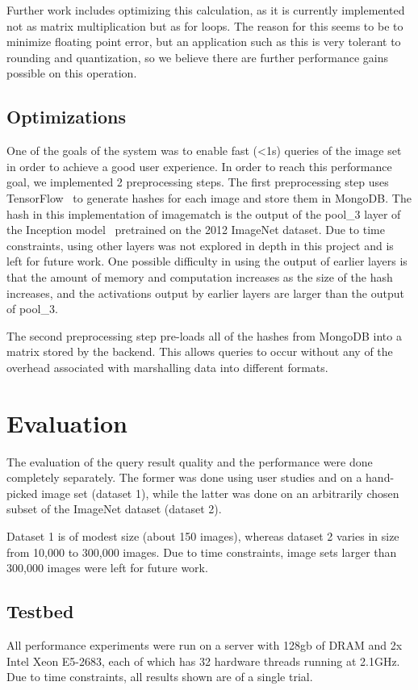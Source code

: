 Further work includes optimizing this calculation, as it is currently implemented not as matrix multiplication
but as for loops.
The reason for this seems to be to minimize floating point error, but an application such as this is very
tolerant to rounding and quantization, so we believe there are further performance gains possible on this
operation.

\subsection{Optimizations}
\label{sec:optimizations}
One of the goals of the system was to enable fast (<1s) queries of the image set in order to achieve
a good user experience.
In order to reach this performance goal, we implemented 2 preprocessing steps.
The first preprocessing step uses TensorFlow~\cite{abadi2016tensorflow} to generate hashes for each image and
store them in MongoDB.
The hash in this implementation of imagematch is the output of the pool\_3 layer of the Inception
model~\cite{szegedy2015going} pretrained on the 2012 ImageNet dataset.
Due to time constraints, using other layers was not explored in depth in this project and is left for
future work.
One possible difficulty in using the output of earlier layers is that the amount of memory and computation
increases as the size of the hash increases, and the activations output by earlier layers are larger than
the output of pool\_3.

The second preprocessing step pre-loads all of the hashes from MongoDB into a matrix stored by the backend.
This allows queries to occur without any of the overhead associated with marshalling data into different formats.

\section{Evaluation}
\label{sec:eval}
The evaluation of the query result quality and the performance were done completely separately.
The former was done using user studies and on a hand-picked image set (dataset 1), while the latter was done
on an arbitrarily chosen subset of the ImageNet dataset\cite{krizhevsky2012imagenet} (dataset 2).

Dataset 1 is of modest size (about 150 images), whereas dataset 2 varies in size from 10,000 to 300,000 images.
Due to time constraints, image sets larger than 300,000 images were left for future work.

\subsection{Testbed}
All performance experiments were run on a server with 128gb of DRAM and 2x Intel Xeon E5-2683, each of which has 32 hardware threads running at 2.1GHz.
Due to time constraints, all results shown are of a single trial.

